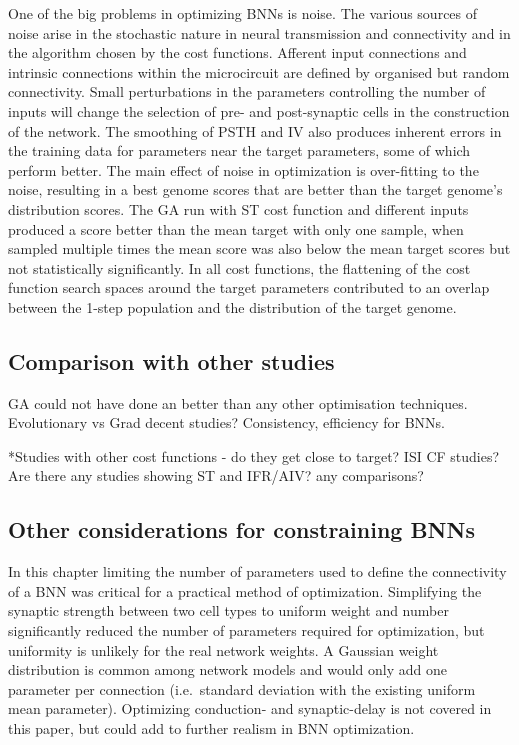 One of the big problems in optimizing BNNs is noise.  The various sources of
noise arise in the stochastic nature in neural transmission and connectivity
and in the algorithm chosen by the cost functions. Afferent input connections
and intrinsic connections within the microcircuit are defined by organised but
random connectivity.  Small perturbations in the parameters controlling the
number of inputs will change the selection of pre- and post-synaptic cells in
the construction of the network.  The smoothing of PSTH and IV also produces
inherent errors in the training data for parameters near the target
parameters, some of which perform better.  The main effect of noise in
optimization is over-fitting to the noise, resulting in a best genome scores
that are better than the target genome's distribution scores.  The GA run with
ST cost function and different inputs produced a score better than the mean
target with only one sample, when sampled multiple times the mean score was
also below the mean target scores but not statistically significantly.  In all
cost functions, the flattening of the cost function search spaces around the
target parameters contributed to an overlap between the 1-step population and
the distribution of the target genome.

\subsection{Comparison with other studies}\label{sec:GA:comp-with-other}



GA could not have done an better than any other optimisation techniques.
Evolutionary vs Grad decent studies?  Consistency, efficiency for BNNs.

\medskip{}

*Studies with  other cost functions - do they get close to target? ISI CF studies?
Are there any studies showing ST and IFR/AIV? any comparisons?

\subsection{Other considerations for constraining BNNs}\label{sec:GA:other-considerations}


In this chapter limiting the number of parameters used to define the connectivity
of a BNN was critical for a practical method of optimization. Simplifying the
synaptic strength between two cell types to uniform weight and number
significantly reduced the number of parameters required for optimization, but
uniformity is unlikely for the real network weights.  A Gaussian weight
distribution is common among network models and would only add one parameter per
connection (i.e.\ standard deviation with the existing uniform mean parameter).
Optimizing conduction- and synaptic-delay is not covered in this paper, but
could add to further realism in BNN optimization.


